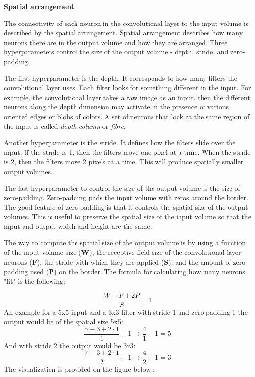 \textbf{Spatial arrangement}

The connectivity of each neuron in the convolutional layer to the input volume is described by the spatial arrangement. Spatial arrangement describes how many neurons there are in the output volume and how they are arranged. Three hyperparameters control the size of the output volume - depth, stride, and zero-padding.

The first hyperparameter is the depth. It corresponds to how many filters the convolutional layer uses. Each filter looks for something different in the input. For example, the convolutional layer takes a raw image as an input, then the different neurons along the depth dimension may activate in the presence of various oriented edges or blobs of colors. A set of neurons that look at the same region of the input is called \textit{depth column} or \textit{fibre}.

Another hyperparameter is the stride. It defines how the filters slide over the input. If the stride is 1, then the filters move one pixel at a time. When the stride is 2, then the filters move 2 pixels at a time. This will produce spatially smaller output volumes.

The last hyperparameter to control the size of the output volume is the size of zero-padding. Zero-padding pads the input volume with zeros around the border. The good feature of zero-padding is that it controls the spatial size of the output volumes. This is useful to preserve the spatial size of the input volume so that the input and output width and height are the same. 

The way to compute the spatial size of the output volume is by using a function of the input volume size ($\textbf{W}$), the receptive field size of the convolutional layer neurons ($\textbf{F}$), the stride with which they are applied ($\textbf{S}$), and the amount of zero padding used ($\textbf{P}$) on the border. The formula for calculating how many neurons "fit" is the following:

\begin{equation}
\frac{W-F+2P}{S}+1
\end{equation}    
An example for a 5x5 input and a 3x3 filter with stride 1 and zero-padding 1 the output would be of the spatial size 5x5:
\begin{equation}
\frac{5-3+2\cdot1 }{1}+1         \rightarrow             \frac{4}{1}+1 =5
\end{equation} 
And with stride 2 the output would be 3x3:
\begin{equation}
\frac{7-3+2\cdot1 }{2}+1         \rightarrow             \frac{4}{2}+1 =3
\end{equation} 
The visualization is provided on the figure below : 

